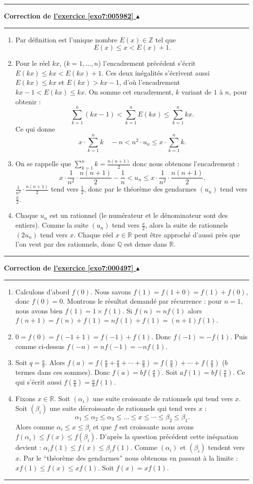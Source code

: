 \documentclass[11pt,a4paper]{article}
\newcommand{\Zz}{\mathbb{Z}} \newcommand{\Z}{\mathbb{Z}}
\newcommand{\Qq}{\mathbb{Q}} \newcommand{\Q}{\mathbb{Q}}
\newcommand{\Rr}{\mathbb{R}} \newcommand{\R}{\mathbb{R}}
\renewcommand{\le}{\leqslant} \renewcommand{\leq}{\leqslant}
\newcounter{exo}
\newcommand{\correction}[1]{\hypertarget{cor7:#1}{}\label{cor7:#1}{\bf Correction de \hyperlink{exo7:#1}{l'exercice \ref{exo7:#1} $\blacktriangle$}}\vspace{1mm}\hrule\vspace{1mm}}
\newcommand{\fincorrection}{\vspace{1mm}\hrule\vspace*{7mm}}
\begin{document}
\fincorrection
\correction{005982}
\begin{enumerate}
 \item Par définition est l'unique nombre $E(x) \in \Zz$ tel que 
 $$E(x) \le x < E(x)+1.$$

 \item Pour le réel $kx$, ($k=1,\ldots,n$) l'encadrement précédent s'écrit $E(kx) \le kx < E(kx)+1$.
 Ces deux inégalités s'écrivent aussi $E(kx) \le kx$ et $E(kx) > kx - 1$, d'où l'encadrement
 $kx-1 < E(kx) \le kx$. On somme cet encadrement, $k$ variant de $1$ à $n$, pour obtenir :
 $$\sum_{k=1}^n (kx-1) < \sum_{k=1}^n E(kx) \le \sum_{k=1}^n kx.$$
Ce qui donne 
$$ x \cdot \sum_{k=1}^n k \quad - n < n^2 \cdot u_n \le x \cdot  \sum_{k=1}^n k.$$

 \item On se rappelle que $\sum_{k=1}^n k = \frac{n(n+1)}{2}$ donc 
 nous obtenons l'encadrement :
 $$ x\cdot  \frac{1}{n^2} \cdot \frac{n(n+1)}{2} -   \frac{1}{n} < u_n \le x \cdot  \frac{1}{n^2} \cdot  \frac{n(n+1)}{2}.$$
 $\frac{1}{n^2} \cdot \frac{n(n+1)}{2}$ tend vers $\frac 12$, donc par le théorème des gendarmes $(u_n)$ tend vers $\frac x2$.

 \item Chaque $u_n$ est un rationnel (le numérateur et le dénominateur sont des entiers).
Comme la suite $(u_n)$ tend vers $\frac x 2$, alors la suite de rationnels $(2u_n)$ tend vers $x$.
Chaque réel $x\in \Rr$ peut être approché d'aussi près que l'on veut par des rationnels, donc 
$\Qq$ est dense dans $\Rr$. 
\end{enumerate}
\fincorrection
\correction{000497}
\begin{enumerate}
\item  Calculons d'abord $f(0)$. Nous savons $f(1) = f(1+0) = f(1) +f(0)$, donc $f(0) = 0$.
Montrons le r\'esultat demand\'e par r\'ecurrence : pour $n=1$, nous
avons bien $f(1)=1\times f(1)$. Si $f(n) = n f(1)$ alors $f(n+1) =
f(n) + f(1) = nf(1) + f(1) = (n+1)f(1)$.
\item $0 = f(0) = f(-1 + 1) = f(-1) + f(1)$. Donc $f(-1) = - f(1)$. Puis comme ci-dessus $f(-n) = n f(-1)= -n f(1)$.
\item Soit $q = \frac ab$. Alors $f(a) = f(\frac ab + \frac ab + \cdots +\frac ab) = f(\frac ab ) + \cdots + f(\frac ab)$
($b$ termes dans ces sommes). Donc $f(a) = b f(\frac ab)$. Soit
$a f(1) = b f(\frac ab)$. Ce qui s'\'ecrit aussi $f(\frac ab) =
\frac ab f(1)$.
\item Fixons $x \in \Rr$. Soit $(\alpha_i)$ une suite croissante de rationnels qui tend vers $x$. Soit
$(\beta_i)$ une suite d\'ecroissante de rationnels qui tend vers $x$
:
$$\alpha_1\leq \alpha_2 \leq \alpha_3 \leq \ldots \leq x \leq \cdots \leq \beta_2 \leq \beta_1.$$
Alors comme $\alpha_i \leq x \leq \beta_i$ et que $f$ est
croissante nous avons $f(\alpha_i)\leq f(x) \leq f(\beta_i)$.
D'apr\`es la question pr\'ec\'edent cette in\'equation devient : $\alpha_i
f(1)\leq f(x)\leq \beta_i f(1)$. Comme $(\alpha_i)$ et $(\beta_i)$
tendent vers $x$. Par le ``th\'eor\`eme des gendarmes'' nous obtenons
en passant \`a la limite : $x f(1) \leq f(x) \leq xf(1)$.  Soit
$f(x) = xf(1)$.
\end{enumerate}
\fincorrection
\end{document}
